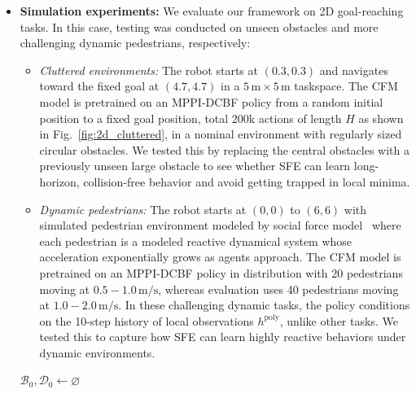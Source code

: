 \begin{itemize}[leftmargin=0pt, itemindent=0pt, label={}]
    
        \item \textbf{Simulation experiments:} We evaluate our framework on 2D goal-reaching tasks. In this case, testing was conducted on unseen obstacles and more challenging dynamic pedestrians, respectively:
    \begin{itemize}
        \item \textit{Cluttered environments:} The robot starts at \((0.3,0.3)\) and navigates toward the fixed goal at \((4.7,4.7)\) in a \(5\,\mathrm{m}\times5\,\mathrm{m}\) taskspace. The CFM model is pretrained on an MPPI-DCBF policy from a random initial position to a fixed goal position, total 200k actions of length $H$ as shown in Fig.~\ref{fig:2d_cluttered}, in a nominal environment with regularly sized circular obstacles. We tested this by replacing the central obstacles with a previously unseen large obstacle to see whether SFE can learn long-horizon, collision-free behavior and avoid getting trapped in local minima.
        
        \item \textit{Dynamic pedestrians:} The robot starts at \((0,0)\) to \((6,6)\) with simulated pedestrian environment modeled by social force model~\cite{helbing1995social} where each pedestrian is a modeled reactive dynamical system whose acceleration exponentially grows as agents approach. The CFM model is pretrained on an MPPI-DCBF policy in distribution with 20 pedestrians moving at \(0.5\!-\!1.0\,\mathrm{m/s}\), whereas evaluation uses 40 pedestrians moving at \(1.0\!-\!2.0\,\mathrm{m/s}\). In these challenging dynamic tasks, the policy conditions on the 10-step history of local observations $h^\text{poly}$, unlike other tasks. We tested this to capture how SFE can learn highly reactive behaviors under dynamic environments.
    \end{itemize}
    
\begin{algorithm}[t]
\caption{Safe Flow Expansion}
\label{alg:sfe}
\small
\DontPrintSemicolon

$\mathcal B_0, \mathcal D_0 \gets\varnothing$\;
\end{algorithm}
\end{itemize}
